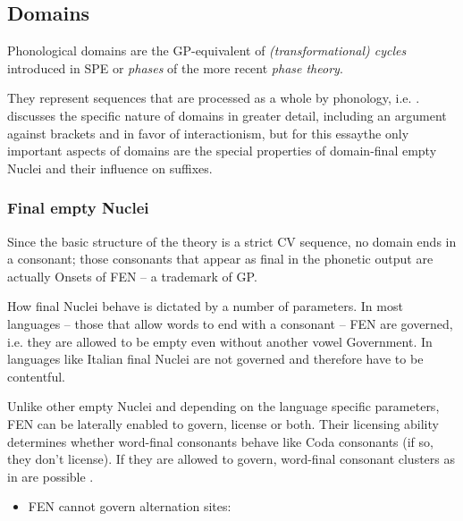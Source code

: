\subsection{Domains}

Phonological domains are the \gls{GP}-equivalent of
\emph{(transformational) cycles} introduced in SPE \parencite{chomsky1968}
or \emph{phases} of the more recent \emph{phase theory}.

They represent sequences that are processed as a whole by phonology, i.e.
.
\Cite{scheer2012} discusses the specific nature of domains in greater
detail, including an argument against brackets and in favor of
interactionism, but for this essay\co the only important aspects of
domains are the special properties of domain-final empty Nuclei and
their influence on suffixes.


\subsubsection{Final empty Nuclei}
Since the basic structure of the theory is a strict CV sequence,
no domain ends in a consonant; those consonants that appear as final
in the phonetic output are actually Onsets of \gls{FEN}
-- a trademark of \gls{GP}.

How final Nuclei behave is dictated by a number of parameters.
In most languages -- those that allow words to end with a consonant --
\gls{FEN} are governed, i.e. they are allowed to be empty even without
another vowel  Government.
In languages like Italian final Nuclei are not governed and therefore
have to be contentful.

Unlike other empty Nuclei and depending on the language specific parameters,
\gls{FEN} can be laterally enabled to govern, license or both.
Their licensing ability determines whether word-final consonants behave
like Coda consonants (if so, they don't license).
If they are allowed to govern, word-final consonant clusters as in 
are possible \cite[appendix~1]{scheer2004}.

\begin{itemize}\color{red}
  \item FEN cannot govern alternation sites:\\
\end{itemize}



